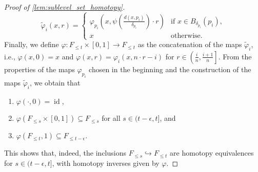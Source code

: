 \begin{proof}[Proof of \cref{lem:sublevel_set_homotopy}]
	\[
		\tilde{\varphi}_{i}(x,r) = 
		\begin{cases}
			\varphi_{p_{i}} \left( x, \psi \left( \frac{d(x,p_{i})}{\delta_{p_{i}}} \right) \cdot r \right)  & \text{if } x \in B_{\delta_{p_{i}}}(p_{i}), \\
			x & \text{otherwise}.
		\end{cases}
	\]
	Finally, we define $\varphi \colon F_{\leq t} \times [0,1] \to F_{\leq t}$ as the concatenation of the maps $\tilde{\varphi}_{i}$, i.e., $\varphi(x,0) = x$ and $\varphi(x,r) = \varphi_{i} \left( x, n \cdot r - i \right)$ for $r \in \left( \frac{i}{n}, \frac{i+1}{n} \right]$.
	From the properties of the maps $\varphi_{p_{i}}$ chosen in the beginning and the construction of the maps $\tilde{\varphi}_{i}$, we obtain that 
	\begin{enumerate}
		\item $\varphi(\cdot, 0) = \operatorname{id}$, 
		\item $\varphi(F_{\leq s} \times [0,1]) \subseteq F_{\leq s}$ for all $s \in (t - \epsilon, t]$, and 
		\item $\varphi(F_{\leq t}, 1) \subseteq F_{\leq t - \epsilon}$.
	\end{enumerate}
	This shows that, indeed, the inclusions $F_{\leq s} \hookrightarrow F_{\leq t}$ are homotopy equivalences for $s \in (t - \epsilon, t]$, with homotopy inverses given by $\varphi$.
\end{proof}
